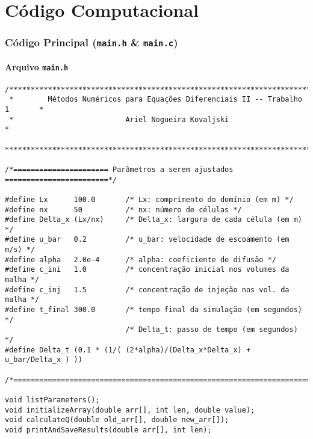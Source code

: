 \chapter{Código Computacional}

\subsection{Código Principal (\texttt{main.h} \& \texttt{main.c})}

\subsubsection{Arquivo \texttt{main.h}}

\begin{Verbatim}[fontsize=\footnotesize]
/******************************************************************************
 *        Métodos Numéricos para Equações Diferenciais II -- Trabalho 1       *
 *                          Ariel Nogueira Kovaljski                          *
 ******************************************************************************/

/*====================== Parâmetros a serem ajustados ========================*/

#define Lx      100.0       /* Lx: comprimento do domínio (em m) */
#define nx      50          /* nx: número de células */
#define Delta_x (Lx/nx)     /* Delta_x: largura de cada célula (em m) */
#define u_bar   0.2         /* u_bar: velocidade de escoamento (em m/s) */
#define alpha   2.0e-4      /* alpha: coeficiente de difusão */
#define c_ini   1.0         /* concentração inicial nos volumes da malha */
#define c_inj   1.5         /* concentração de injeção nos vol. da malha */
#define t_final 300.0       /* tempo final da simulação (em segundos) */
                            /* Delta_t: passo de tempo (em segundos) */
#define Delta_t (0.1 * (1/( (2*alpha)/(Delta_x*Delta_x) + u_bar/Delta_x ) ))

/*============================================================================*/

void listParameters();
void initializeArray(double arr[], int len, double value);
void calculateQ(double old_arr[], double new_arr[]);
void printAndSaveResults(double arr[], int len);
\end{Verbatim}

